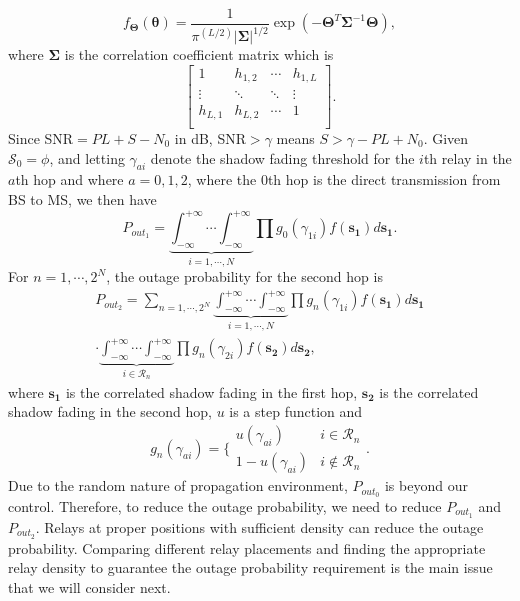 \begin{equation}
f_{\mathbf{\Theta}}(\mathbf{\theta}) = \frac{1}{\pi^(L/2)|\mathbf{\Sigma}|^{1/2}}\exp(-\mathbf{\Theta}^{T}\mathbf{\Sigma}^{-1}\mathbf{\Theta}),
\end{equation}
where $\mathbf{\Sigma}$ is the correlation coefficient matrix which is
\begin{equation}
\left[\begin{array}{cccc}
1 & h_{1,2} & \cdots & h_{1,L}\\
\vdots & \ddots & \ddots & \vdots\\
h_{L,1} & h_{L,2} & \cdots & 1\\
\end{array}\right].
\end{equation}
Since SNR$=PL+S-N_{0}$ in dB, SNR$>\gamma$ means $S>\gamma-PL+N_{0}$.
Given $\mathcal{S}_{0}=\phi$, and letting $\gamma_{ai}$ denote the shadow fading threshold for the $i$th relay in the $a$th hop and where $a=0,1,2$, where the $0$th hop is the direct transmission from BS to MS, we then have
\begin{equation}
P_{out_{1}} = \underbrace{\int_{-\infty}^{+\infty}\cdots\int_{-\infty}^{+\infty}}_{i =1,\cdots,N}\prod g_{0}(\gamma_{1i})f(\mathbf{s_{1}})d\mathbf{s_{1}}.
\end{equation}
For $n=1,\cdots,2^{N}$, the outage probability for the second hop is
\begin{equation}
\begin{split}
P_{out_{2}} = \sum_{n=1,\cdots,2^{N}}\underbrace{\int_{-\infty}^{+\infty}\cdots\int_{-\infty}^{+\infty}}_{i=1,\cdots,N}\prod g_{n}(\gamma_{1i}) f(\mathbf{s_{1}})d\mathbf{s_{1}}\\
\cdot\underbrace{\int_{-\infty}^{+\infty}\cdots\int_{-\infty}^{+\infty}}_{i\in \mathcal{R}_{n}}\prod g_{n}(\gamma_{2i})f(\mathbf{s_{2}})d\mathbf{s_{2}},
\end{split}
\end{equation}
where $\mathbf{s_{1}}$ is the correlated shadow fading in the first hop, $\mathbf{s_{2}}$ is the correlated shadow fading in the second hop, $u$ is a step function and
\begin{equation}
g_{n}(\gamma_{ai}) = \{\begin{array}{cc}
               u(\gamma_{ai}) & i\in \mathcal{R}_{n} \\
               1-u(\gamma_{ai}) & i\notin \mathcal{R}_{n}
             \end{array}.
\end{equation}
Due to the random nature of propagation environment, $P_{out_{0}}$ is beyond our control. Therefore, to reduce the outage probability, we need to reduce $P_{out_{1}}$ and $P_{out_{2}}$. Relays at proper positions with sufficient density can reduce the outage probability. Comparing different relay placements and finding the appropriate relay density to guarantee the outage probability requirement is the main issue that we will consider next.


